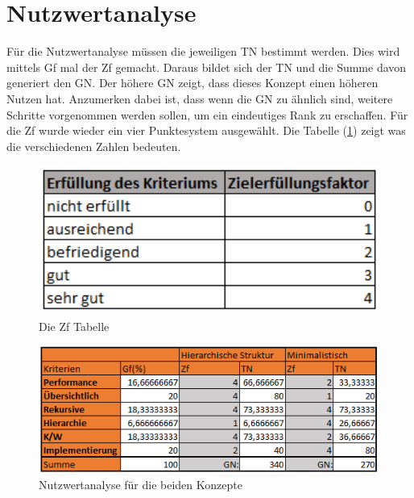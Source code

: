\section{Nutzwertanalyse}
\label{sec:chapter05:Nutz}
Für die Nutzwertanalyse müssen die jeweiligen \ac{TN} bestimmt werden.
Dies wird mittels \ac{Gf} mal der \ac{Zf} gemacht.
Daraus bildet sich der \ac{TN} und die Summe davon generiert den \ac{GN}.
Der höhere \ac{GN} zeigt, dass dieses Konzept einen höheren Nutzen hat.
Anzumerken dabei ist, dass wenn die \ac{GN} zu ähnlich sind, weitere Schritte vorgenommen werden sollen, um ein eindeutiges Rank zu erschaffen.
Für die \ac{Zf} wurde wieder ein vier Punktesystem ausgewählt.
Die Tabelle (\ref{fig:Ziel}) zeigt was die verschiedenen Zahlen bedeuten. \cite{BdIufH}
\begin{figure}[h!]
 \centering
 \includegraphics[width=1\textwidth]{gfx/Picture/Ziel.PNG}
 \caption{Die Zf Tabelle}
 \label{fig:Ziel}
\end{figure}
\newpage
\begin{figure}[h!]
 \centering
 \includegraphics[width=1\textwidth]{gfx/Picture/Nutzwert.PNG}
 \caption{Nutzwertanalyse für die beiden Konzepte}
 \label{fig:Nutz}
\end{figure}

